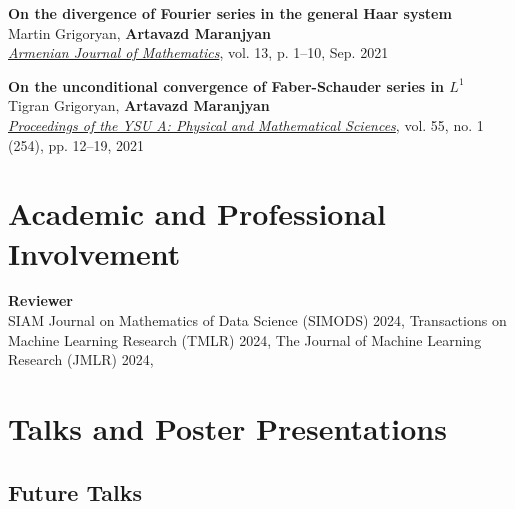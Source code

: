 \documentclass[11pt,a4paper,sans]{moderncv}        %
\begin{document}
\begin{etaremune}
\item \textbf{On the divergence of Fourier series in the general Haar system}\\
Martin Grigoryan, \textbf{Artavazd Maranjyan}\\ \textcolor{accent}{\href{https://doi.org/10.52737/18291163-2021.13.6-1-10}{\textit{Armenian Journal of Mathematics}}}, vol. 13, p. 1–10, Sep. 2021

\vspace{2mm}

\item \textbf{On the unconditional convergence of Faber-Schauder series in $L^1$}\\
Tigran Grigoryan, \textbf{Artavazd Maranjyan}\\
\textcolor{accent}{\href{http://www.old.ysu.am/files/vol55\_no1\_2021\_pp12\%E2\%80\%9319.pdf}{\textit{Proceedings of the YSU A: Physical and Mathematical Sciences}}}, vol. 55, no. 1 (254), pp. 12–19, 2021
\end{etaremune}

\section{Academic and Professional Involvement}
\vspace{4pt}

\textbf{Reviewer}\\
SIAM Journal on Mathematics of Data Science (SIMODS) 2024, 
Transactions on Machine Learning Research (TMLR) 2024, 
The Journal of Machine Learning Research (JMLR) 2024,

\vspace{10pt}


\section{Talks and Poster Presentations}
\subsection{Future Talks}
\vspace{4pt}
\end{document}
